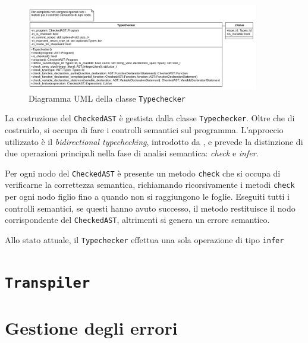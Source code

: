 \begin{figure}[H]
	\centering
	\includegraphics[width=0.9\textwidth]{figures/typechecker.png}
	\caption{Diagramma UML della classe \texttt{Typechecker}}
	\label{fig:typechecker-uml}
\end{figure}

La costruzione del \texttt{CheckedAST} \`e gestista dalla classe \texttt{Typechecker}. Oltre che di costruirlo, si occupa di fare i controlli semantici sul programma. L'approccio utilizzato \`e il \emph{bidirectional typechecking}, introdotto da \cite{pierce2000local}, e prevede la distinzione di due operazioni principali nella fase di analisi semantica: \emph{check} e \emph{infer}.

Per ogni nodo del \texttt{CheckedAST} \`e presente un metodo \texttt{check} che si occupa di verificarne la correttezza semantica, richiamando ricorsivamente i metodi \texttt{check} per ogni nodo figlio fino a quando non si raggiungono le foglie. Eseguiti tutti i controlli semantici, se questi hanno avuto successo, il metodo restituisce il nodo corrispondente del \texttt{CheckedAST}, altrimenti si genera un errore semantico.


Allo stato attuale, il \texttt{Typechecker} effettua una sola operazione di tipo \texttt{infer}


\section{\texttt{Transpiler}}
\label{sec:transpiler}

\section{Gestione degli errori}
\label{sec:gestione-degli-errori}
